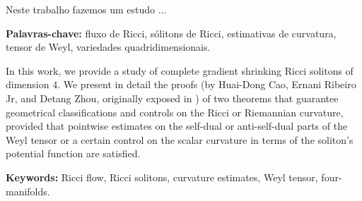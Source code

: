

\PlaceText{69mm}{39mm}{ \color{gal}\noindent\makebox[\linewidth]{\rule{2\paperwidth}{1pt}}}

\PlaceText{69mm}{11mm}{ \color{gal}\noindent\makebox[\linewidth]{\rule{2\paperwidth}{1pt}}}


\vspace{2.5cm}


Neste trabalho fazemos um estudo ... \par 
\textbf{Palavras-chave:} fluxo de Ricci, sólitons de Ricci, estimativas de curvatura, tensor de Weyl, variedades quadridimensionais.

\iffalse

Neste trabalho apresentamos um estudo de sólitons de Ricci quadridimensionais gradiente completos e shrinking. Apresentamos detalhadamente as demonstrações (de autoria de Huai-Dong Cao, Ernani Ribeiro Jr, e Detang Zhou, expostas originalmente em \mycitep{ernani}) de dois teoremas que garantem certas classificações topológicas e controles na curvatura de Ricci ou curvatura Riemanniana, desde que sejam satisfeitas certas estimativas pontuais sobre as partes duais ou anti-auto-duais do tensor de Einstein ou um certo controle sobre a curvatura escalar.
\fi

\newpage 

\PlaceText{69mm}{39mm}{ \color{gal}\noindent\makebox[\linewidth]{\rule{2\paperwidth}{1pt}}}

\PlaceText{69mm}{11mm}{ \color{gal}\noindent\makebox[\linewidth]{\rule{2\paperwidth}{1pt}}}


\vspace{2.5cm}

In this work, we provide a study of complete gradient shrinking Ricci solitons of dimension $4$. We present in detail the proofs (by Huai-Dong Cao, Ernani Ribeiro Jr, and Detang Zhou, originally exposed in ) of two theorems that guarantee geometrical classifications and controls on the Ricci or Riemannian curvature, provided that pointwise estimates on the self-dual or anti-self-dual parts of the Weyl tensor or a certain control on the scalar curvature in terms of the soliton's potential function are satisfied.\par
\textbf{Keywords:} Ricci flow, Ricci solitons, curvature estimates, Weyl tensor, four-manifolds. 


\iffalse
\begin{resumo}
    Resumo em Português.
\end{resumo}


\begin{abstract}
This is where you write your abstract ...
\end{abstract}
\fi
